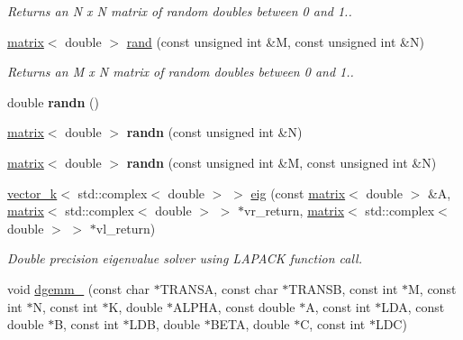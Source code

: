 \begin{DoxyCompactItemize}
\begin{DoxyCompactList}\small\item\em Returns an N x N matrix of random doubles between 0 and 1.. \end{DoxyCompactList}\item 
\hypertarget{namespacekeycpp_af6413232f2de6f8ac96efde6531c3055}{\hyperlink{classkeycpp_1_1matrix}{matrix}$<$ double $>$ \hyperlink{namespacekeycpp_af6413232f2de6f8ac96efde6531c3055}{rand} (const unsigned int \&M, const unsigned int \&N)}\label{namespacekeycpp_af6413232f2de6f8ac96efde6531c3055}

\begin{DoxyCompactList}\small\item\em Returns an M x N matrix of random doubles between 0 and 1.. \end{DoxyCompactList}\item 
\hypertarget{namespacekeycpp_abbb4c27d8c550f3a522dcd4334986161}{double {\bfseries randn} ()}\label{namespacekeycpp_abbb4c27d8c550f3a522dcd4334986161}

\item 
\hypertarget{namespacekeycpp_ab55434470472a4b6c511e5a713a4d654}{\hyperlink{classkeycpp_1_1matrix}{matrix}$<$ double $>$ {\bfseries randn} (const unsigned int \&N)}\label{namespacekeycpp_ab55434470472a4b6c511e5a713a4d654}

\item 
\hypertarget{namespacekeycpp_a43bbf0f2c5e3c68a4e03abcce5aa63da}{\hyperlink{classkeycpp_1_1matrix}{matrix}$<$ double $>$ {\bfseries randn} (const unsigned int \&M, const unsigned int \&N)}\label{namespacekeycpp_a43bbf0f2c5e3c68a4e03abcce5aa63da}

\item 
\hyperlink{classkeycpp_1_1vector__k}{vector\-\_\-k}$<$ std\-::complex$<$ double $>$ $>$ \hyperlink{namespacekeycpp_aa14e19e286b30265734236c0af2f9e78}{eig} (const \hyperlink{classkeycpp_1_1matrix}{matrix}$<$ double $>$ \&A, \hyperlink{classkeycpp_1_1matrix}{matrix}$<$ std\-::complex$<$ double $>$ $>$ $\ast$vr\-\_\-return, \hyperlink{classkeycpp_1_1matrix}{matrix}$<$ std\-::complex$<$ double $>$ $>$ $\ast$vl\-\_\-return)
\begin{DoxyCompactList}\small\item\em Double precision eigenvalue solver using L\-A\-P\-A\-C\-K function call. \end{DoxyCompactList}\item 
\hypertarget{namespacekeycpp_a16b58f47ed977cafdc96227468f5f10a}{void \hyperlink{namespacekeycpp_a16b58f47ed977cafdc96227468f5f10a}{dgemm\-\_\-} (const char $\ast$T\-R\-A\-N\-S\-A, const char $\ast$T\-R\-A\-N\-S\-B, const int $\ast$M, const int $\ast$N, const int $\ast$K, double $\ast$A\-L\-P\-H\-A, const double $\ast$A, const int $\ast$L\-D\-A, const double $\ast$B, const int $\ast$L\-D\-B, double $\ast$B\-E\-T\-A, double $\ast$C, const int $\ast$L\-D\-C)}\label{namespacekeycpp_a16b58f47ed977cafdc96227468f5f10a}


\end{DoxyCompactItemize}
